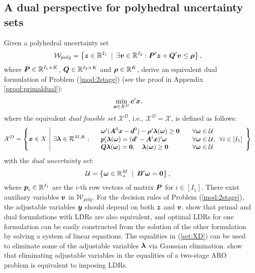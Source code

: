 \documentclass[fleqn,orsc,blindrev]{informs4}
\newcommand{\mb}[1]{\mbox{\boldmath \ensuremath{#1}}}
\begin{document}
	\subsection{A dual perspective for polyhedral uncertainty sets}
	\noindent Given a polyhedral uncertainty set
\begin{equation*}
	\mathcal{W}_{poly} = \left\{\mb{z}\in \mathbb{R}^{I_1} \enskip |\enskip \exists \mb{v} \in \mathbb{R}^{I_2}: \mb{P}'\mb{z} + \mb{Q}'\mb{v} \le \mb{\rho} \right\},
\end{equation*}
	where $\mb{P}\in \mathbb{R}^{ I_1 \times K }$, $\mb{Q}\in \mathbb{R}^{ I_2 \times K }$  and  $\mb{\rho}\in \mathbb{R}^{K}$, \cite{bd16} derive an equivalent dual formulation of Problem (\ref{mod:2stage}) (see the proof in Appendix \ref{proof:primaldual}):
\begin{equation}
		\label{mod:2stagedual}
		\min_{\boldsymbol{x} \in \mathcal{X}^D} \mb{c}'\mb{x}, 
\end{equation}
	where the equivalent {\em dual feasible set} $\mathcal{X}^D$, i.e., $\mathcal{X}^D=\mathcal{X}$, is defined as follows:
\begin{equation}
		\label{set:XD}
		\mathcal{X}^D=  \left\{ \mb{x} \in X \enskip \vline \enskip
		\exists \mb{\lambda} \in \mathcal{R}^{M,K}:	\begin{array}{lll}
			&  \mb{\omega}' (\mb{A}^0\mb{x}-\mb{d}^0) - \mb{\rho}'\mb{\lambda}(\mb{\omega}) \ge \mb{0} & \quad  \forall \mb{\omega} \in \mathcal{U}\\
			&\mb{p}_i'\mb{\lambda}(\mb{\omega}) = (\mb{d}^i- \mb{A}^i\mb{x})'\mb{\omega} & \quad  \forall \mb{\omega} \in \mathcal{U}, \enskip \forall i\in [I_1]\\
			&\displaystyle  \mb{Q}\mb{\lambda}(\mb{\omega}) = \mb{0}, \quad  \mb{\lambda}(\mb{\omega}) \ge \mb{0} & \quad \forall \mb{\omega} \in \mathcal{U}
		\end{array}
		\right\}
\end{equation}
	with the {\it dual uncertainty set}:
\begin{equation*}\label{set:U}
	\mathcal{U} = \left\{\mb{\omega}\in \mathbb{R}^{M}_+ \enskip |\enskip \mb{B}'\mb{\omega} = \mb{0} \right\},
\end{equation*}
	where $\mb{p}_i\in \mathbb{R}^{I_1}$ are the $i$-th row vectors of matrix $\mb{P}$ for $i\in [I_1]$.  There exist auxiliary variables $\mb{v}$ in $\mathcal{W}_{poly}$. For the decision rules of Problem (\ref{mod:2stage}), the adjustable variables $\mb{y}$ should depend on both $\mb{z}$ and $\mb{v}$. \cite{bd16} show that primal and dual formulations with LDRs are also equivalent, and optimal LDRs for one formulation can be easily constructed from the solution of the other formulation by solving a system of linear equations. The equalities in (\ref{set:XD}) can be used to eliminate some of the adjustable variables $\mb{\lambda}$ via Gaussian elimination.  {\cite{zd17b} show that eliminating adjustable variables in the equalities of a two-stage ARO problem is equivalent to imposing LDRs.}
	
\end{document}
